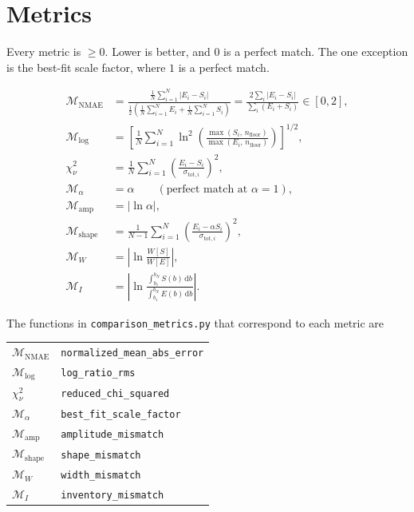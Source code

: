 \documentclass[11pt]{article}
\begin{document}
\section*{Metrics}

Every metric is $\ge 0$. Lower is better, and $0$ is a perfect match. The one exception is the
best-fit scale factor, where $1$ is a perfect match.

\begin{align}
  \mathcal{M}_{\mathrm{NMAE}}
    &= \frac{\frac{1}{N}\sum_{i=1}^{N} \left|E_i - S_i\right|}
            {\frac{1}{2}\left(\frac{1}{N}\sum_{i=1}^{N} E_i + \frac{1}{N}\sum_{i=1}^{N} S_i\right)}
     = \frac{2\sum_{i} \left|E_i - S_i\right|}{\sum_{i} \left(E_i + S_i\right)}
     \in [0, 2], \\[6pt]
  \mathcal{M}_{\mathrm{log}}
    &= \left[\frac{1}{N}\sum_{i=1}^{N}
       \ln^2\!\left(\frac{\max\!\left(S_i,\, n_{\mathrm{floor}}\right)}
                         {\max\!\left(E_i,\, n_{\mathrm{floor}}\right)}\right)\right]^{1/2}, \\[6pt]
  \chi^2_{\nu}
    &= \frac{1}{N}\sum_{i=1}^{N} \left(\frac{E_i - S_i}{\sigma_{\mathrm{tot},i}}\right)^2, \\[6pt]
  \mathcal{M}_{\alpha}
    &= \alpha \qquad (\text{perfect match at } \alpha = 1), \\[6pt]
  \mathcal{M}_{\mathrm{amp}}
    &= \left|\ln \alpha\right|, \\[6pt]
  \mathcal{M}_{\mathrm{shape}}
    &= \frac{1}{N-1}\sum_{i=1}^{N} \left(\frac{E_i - \alpha S_i}{\sigma_{\mathrm{tot},i}}\right)^2, \\[6pt]
  \mathcal{M}_{W}
    &= \left|\ln\frac{W[S]}{W[E]}\right|, \\[6pt]
  \mathcal{M}_{I}
    &= \left|\ln\frac{\int_{b_1}^{b_N} S(b)\,\mathrm{d}b}{\int_{b_1}^{b_N} E(b)\,\mathrm{d}b}\right|.
\end{align}

The functions in \texttt{comparison\_metrics.py} that correspond to each metric are
\begin{center}
\begin{tabular}{ll}
  $\mathcal{M}_{\mathrm{NMAE}}$  & \texttt{normalized\_mean\_abs\_error} \\
  $\mathcal{M}_{\mathrm{log}}$   & \texttt{log\_ratio\_rms} \\
  $\chi^2_{\nu}$                 & \texttt{reduced\_chi\_squared} \\
  $\mathcal{M}_{\alpha}$         & \texttt{best\_fit\_scale\_factor} \\
  $\mathcal{M}_{\mathrm{amp}}$   & \texttt{amplitude\_mismatch} \\
  $\mathcal{M}_{\mathrm{shape}}$ & \texttt{shape\_mismatch} \\
  $\mathcal{M}_{W}$              & \texttt{width\_mismatch} \\
  $\mathcal{M}_{I}$              & \texttt{inventory\_mismatch}
\end{tabular}
\end{center}
\end{document}
